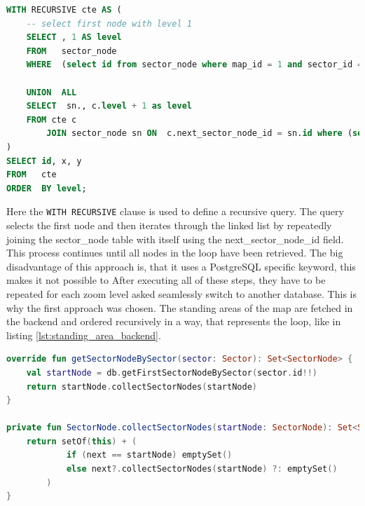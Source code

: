 \begin{lstlisting}[language=SQL, caption=Recursive Query, label=lst:recursive_query]
WITH RECURSIVE cte AS (
    -- select first node with level 1
    SELECT , 1 AS level
    FROM   sector_node
    WHERE  (select id from sector_node where map_id = 1 and sector_id = 1 LIMIT 1) = id

    UNION  ALL
    SELECT  sn., c.level + 1 as level
    FROM cte c
        JOIN sector_node sn ON  c.next_sector_node_id = sn.id where (select id from sector_node where map_id = 1 and sector_id = 1 LIMIT 1) != sn.id
)
SELECT id, x, y
FROM   cte
ORDER  BY level;
\end{lstlisting}

Here the \texttt{WITH RECURSIVE} clause is used to define a recursive query. The query selects the first node and then iterates through the linked list by repeatedly joining the sector\_node table with itself using the next\_sector\_node\_id field. This process continues until all nodes in the loop have been retrieved. The big disadvantage of this approach is, that it uses a PostgreSQL specific keyword, this makes it not possible to After executing all of these steps, they have to be repeated for each zoom level asked seamlessly switch to another database. This is why the first approach was chosen. The standing areas of the map are fetched in the backend and ordered recursively in a way, that represents the loop, like in listing \ref{lst:standing_area_backend}.

\begin{lstlisting}[language=Kotlin, caption=Standing Area Backend, label=lst:standing_area_backend]
override fun getSectorNodeBySector(sector: Sector): Set<SectorNode> {
    val startNode = db.getFirstSectorNodeBySector(sector.id!!)
    return startNode.collectSectorNodes(startNode)
}

private fun SectorNode.collectSectorNodes(startNode: SectorNode): Set<SectorNode> {
    return setOf(this) + (
            if (next == startNode) emptySet() 
            else next?.collectSectorNodes(startNode) ?: emptySet()
        )
}
\end{lstlisting}